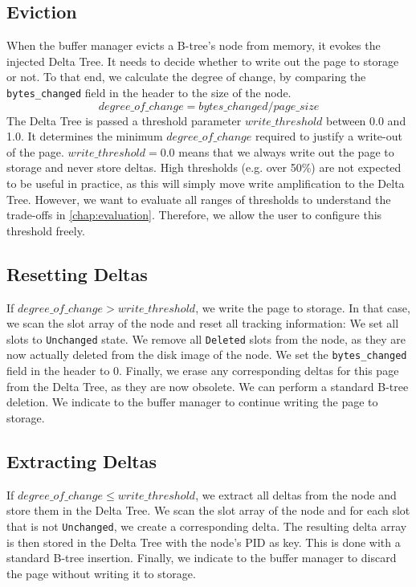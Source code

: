 \subsection*{Eviction}
When the buffer manager evicts a B-tree's node from memory, it evokes the injected Delta Tree.
It needs to decide whether to write out the page to storage or not.
To that end, we calculate the degree of change, by comparing the \texttt{bytes\_changed} field in the header to the size of the node.
\[degree\_of\_change = bytes\_changed / page\_size\]
The Delta Tree is passed a threshold parameter $write\_threshold$ between 0.0 and 1.0.
It determines the minimum $degree\_of\_change$ required to justify a write-out of the page.
$write\_threshold = 0.0$ means that we always write out the page to storage and never store deltas.
High thresholds (e.g. over 50\%) are not expected to be useful in practice, as this will simply move write amplification to the Delta Tree.
However, we want to evaluate all ranges of thresholds to understand the trade-offs in \autoref{chap:evaluation}.
Therefore, we allow the user to configure this threshold freely.

\subsection*{Resetting Deltas}
If $degree\_of\_change > write\_threshold$, we write the page to storage. 
In that case, we scan the slot array of the node and reset all tracking information:
We set all slots to \texttt{Unchanged} state.
We remove all \texttt{Deleted} slots from the node, as they are now actually deleted from the disk image of the node.
We set the \texttt{bytes\_changed} field in the header to 0.
Finally, we erase any corresponding deltas for this page from the Delta Tree, as they are now obsolete.
We can perform a standard B-tree deletion.
We indicate to the buffer manager to continue writing the page to storage.

\subsection*{Extracting Deltas}
If $degree\_of\_change \leq write\_threshold$, we extract all deltas from the node and store them in the Delta Tree.
We scan the slot array of the node and for each slot that is not \texttt{Unchanged}, we create a corresponding delta.
The resulting delta array is then stored in the Delta Tree with the node's \ac{PID} as key.
This is done with a standard B-tree insertion.
Finally, we indicate to the buffer manager to discard the page without writing it to storage.

